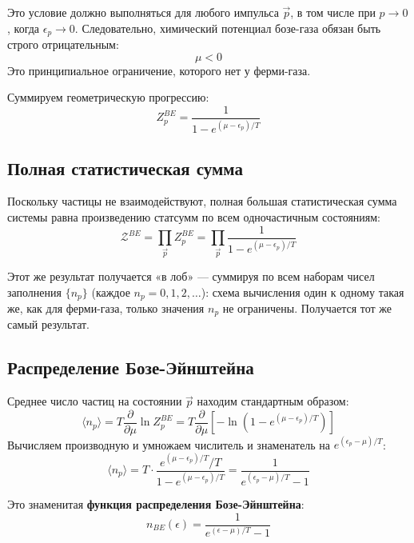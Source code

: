 \documentclass[../general/general]{subfiles}
\begin{document}
Это условие должно выполняться для любого импульса $\vec{p}$, в том числе при $p \to 0$, когда $\epsilon_p \to 0$. Следовательно, химический потенциал бозе-газа обязан быть строго отрицательным:
\begin{equation}
    \mu < 0
\end{equation}
Это принципиальное ограничение, которого нет у ферми-газа.

Суммируем геометрическую прогрессию:
\begin{equation}
    Z_p^{BE} = \frac{1}{1 - e^{(\mu-\epsilon_p)/T}}
    \label{eq:Zp_BE}
\end{equation}

\subsection{Полная статистическая сумма}

Поскольку частицы не взаимодействуют, полная большая статистическая сумма системы равна произведению статсумм по всем одночастичным состояниям:
\begin{equation}
    \mathcal{Z}^{BE} = \prod_{\vec{p}} Z_p^{BE} = \prod_{\vec{p}} \frac{1}{1 - e^{(\mu-\epsilon_p)/T}}
\end{equation}

Этот же результат получается «в лоб» --- суммируя по всем наборам чисел заполнения $\{n_p\}$ (каждое $n_p = 0, 1, 2, \ldots$): схема вычисления один к одному такая же, как для ферми-газа, только значения $n_p$ не ограничены. Получается тот же самый результат.

\subsection{Распределение Бозе-Эйнштейна}

Среднее число частиц на состоянии $\vec{p}$ находим стандартным образом:
\begin{equation}
    \langle n_p\rangle = T\frac{\partial}{\partial\mu}\ln Z_p^{BE} = T\frac{\partial}{\partial\mu}\!\left[-\ln\!\left(1 - e^{(\mu-\epsilon_p)/T}\right)\right]
\end{equation}
Вычисляем производную и умножаем числитель и знаменатель на $e^{(\epsilon_p-\mu)/T}$:
\begin{equation}
    \langle n_p\rangle = T\cdot\frac{e^{(\mu-\epsilon_p)/T}/T}{1 - e^{(\mu-\epsilon_p)/T}} = \frac{1}{e^{(\epsilon_p - \mu)/T} - 1}
\end{equation}

Это знаменитая \textbf{функция распределения Бозе-Эйнштейна}:
\begin{equation}
    n_{BE}(\epsilon) = \frac{1}{e^{(\epsilon-\mu)/T} - 1}
\end{equation}
\end{document}
